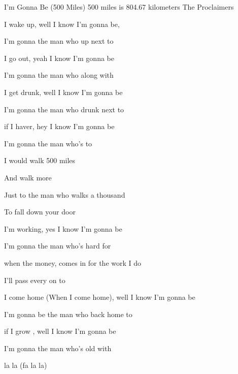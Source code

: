 \begin{SBSong}{I'm Gonna Be (500 Miles)}
    {500 miles is 804.67 kilometers}
    {The Proclaimers}
  \begin{SBVerse}
     I wake up, well I know I'm gonna be,

    I'm gonna  the man who  up next to 

     I go out, yeah I know I'm gonna be

    I'm gonna  the man who  along with 

     I get drunk, well I know I'm gonna be

    I'm gonna  the man who  drunk next to 

     if I haver, hey I know I'm gonna be

    I'm gonna  the man who's  to 
  \end{SBVerse}
  \begin{SBChorus}
     I would walk 500 miles

    And  walk  more

    Just to  the man who walks a thousand 

    To fall down  your door
  \end{SBChorus}
  \begin{SBVerse}
     I'm working, yes I know I'm gonna be

    I'm gonna  the man who's  hard for 

     when the money, comes in for the work I do

    I'll pass  every  on to 

     I come home (When I come home), well I know I'm gonna be

    I'm gonna be the man who  back home to 

     if I grow , well I know I'm gonna be

	I'm gonna  the man who's  old with 
  \end{SBVerse}
  \CBPageBrk
  \begin{SBChorus*}
	 la la (fa la la)
	

\end{SBChorus*}
\end{SBSong}
